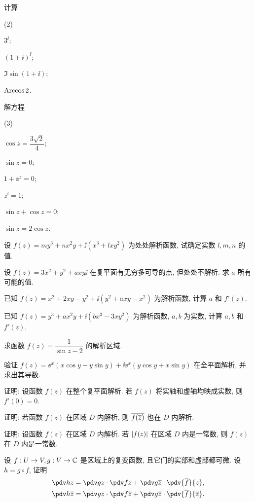 \begin{homework}
\begin{homework}
    \item 计算
      \begin{subhomework}(2)
        \item $3^\ii$;
        \item $(1+\ii)^\ii$;
        \item $\Im\sin(1+\ii)$;
        \item $\operatorname{Arccos} 2$.
      \end{subhomework}
    \item 解方程 
      \begin{subhomework}(3)
        \item $\cos z=\dfrac{3\sqrt2}4$;
        \item $\sin z=0$;
        \item $1+\ee^z=0$;
        \item $z^\ii=1$;
        \item $\sin z+\cos z=0$;
        \item $\sin z=2\cos z$.
      \end{subhomework}
    \item 设 $f(z)=my^3+nx^2y+\ii(x^3+lxy^2)$ 为处处解析函数, 试确定实数 $l,m,n$ 的值.
    \item 设 $f(z)=3x^2+y^2+axy\ii$ 在复平面有无穷多可导的点, 但处处不解析. 求 $a$ 所有可能的值.
    \item 已知 $f(z)=x^2+2xy-y^2+\ii(y^2+axy-x^2)$ 为解析函数, 计算 $a$ 和 $f'(z)$.
    \item 已知 $f(z)=y^3+ax^2y+\ii(bx^3-3xy^2)$ 为解析函数, $a,b$ 为实数, 计算 $a,b$ 和 $f'(z)$.  
    \item 求函数 $f(z)=\dfrac{1}{\sin z-2}$ 的解析区域.
    \item 验证 $f(z)=\ee^x(x\cos y-y\sin y)+\ii \ee^x(y\cos y+x\sin y)$ 在全平面解析, 并求出其导数.
    \item 证明: 设函数 $f(z)$ 在整个复平面解析. 若 $f(z)$ 将实轴和虚轴均映成实数, 则 $f'(0)=0$. 
    \item 证明: 若函数 $f(z)$ 在区域 $D$ 内解析, 则 $\overline{f(\overline z)}$ 也在 $D$ 内解析. 
    \item 证明: 设函数 $f(z)$ 在区域 $D$ 内解析. 若 $\left|f(z)\right|$ 在区域 $D$ 内是一常数, 则 $f(z)$ 在 $D$ 内是一常数.
    \item 设 $f:U\rightarrow V,g:V\rightarrow {\mathbb{C}}$ 是区域上的复变函数, 且它们的实部和虚部都可微. 设 $h=g\circ f$, 证明
    \begin{align*}
      \pdv hz&=\pdv gz \cdot \pdv fz+\pdv g{\ov z}\cdot \pdv {\ov f}{z},\\
      \pdv h{\ov z}&=\pdv gz \cdot \pdv f{\ov z}+\pdv g{\ov z}\cdot \pdv {\ov f}{\ov z}.

\end{align*}
\end{homework}
\end{homework}
